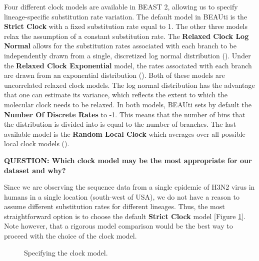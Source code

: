\documentclass[11pt]{article}
\begin{document}
Four different clock models are available in BEAST 2, allowing us to specify lineage-specific substitution rate variation. The default model in BEAUti is the \textbf{Strict Clock} with a fixed substitution rate equal to 1. The other three models relax the assumption of a constant substitution rate. The \textbf{Relaxed Clock Log Normal} allows for the substitution rates associated with each branch to be independently drawn from a single, discretized log normal distribution (\cite{drummond06}). Under the \textbf{Relaxed Clock Exponential} model, the rates associated with each branch are drawn from an exponential distribution (\cite{drummond06}). Both of these models are uncorrelated relaxed clock models. The log normal distribution has the advantage that one can estimate its variance, which reflects the extent to which the molecular clock needs to be relaxed. In both models, BEAUti sets by default the \textbf{Number Of Discrete Rates} to -1. This means that the number of bins that the distribution is divided into is equal to the number of branches. The last available model is the \textbf{Random Local Clock} which averages over all possible local clock models (\cite{drummond10}). 

\begin{framed}
{\bf QUESTION: Which clock model may be the most appropriate for our dataset and why?} 
\end{framed}

Since we are observing the sequence data from a single epidemic of H3N2 virus in humans in a single location (south-west of USA), we do not have a reason to assume different substitution rates for different lineages. Thus, the most straightforward option is to choose the default \textbf{Strict Clock} model [Figure \ref{clockModel}]. Note however, that a rigorous model comparison would be the best way to proceed with the choice of the clock model.

\begin{figure}[h!]
\centering
{}
\caption{\small Specifying the clock model.}
\label{clockModel}
\end{figure}
\end{document}
